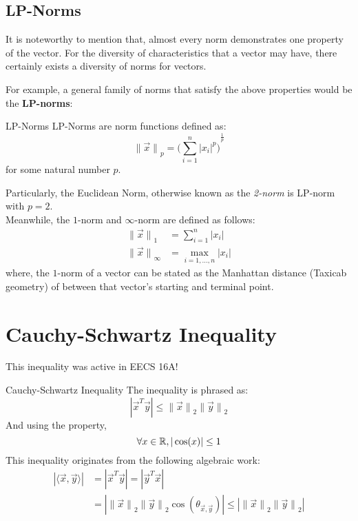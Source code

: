\subsection{LP-Norms}
It is noteworthy to mention that, almost every norm demonstrates one property of the vector.
For the diversity of characteristics that a vector may have, there certainly exists a diversity of norms for vectors.
\par
For example, a general family of norms that satisfy the above properties would be the \textbf{LP-norms}:
\begin{ln-define}{LP-Norms}{}
    LP-Norms are norm functions defined as:
    \[
        {\lVert \vec{x} \rVert}_p = {\bigg( \sum_{i = 1}^n |x_i|^p \bigg)}^{\frac{1}{p}}
    \]
    for some natural number $p$. \\
\end{ln-define}
Particularly, the Euclidean Norm, otherwise known as the \textit{2-norm} is LP-norm with $p = 2$. \\
Meanwhile, the $1$-norm and $\infty$-norm are defined as follows:
\begin{align*}
    {\lVert \vec{x} \rVert}_1 &= \sum_{i = 1}^n |x_i| \\
    {\lVert \vec{x} \rVert}_\infty &= \max_{i = 1, \dots, n} |x_i|
\end{align*}
where, the $1$-norm of a vector can be stated as the Manhattan distance (Taxicab geometry) of between that vector's starting and terminal point.

\section{Cauchy-Schwartz Inequality}
This inequality was active in EECS 16A!
\begin{ln-define}{Cauchy-Schwartz Inequality}{}
    The inequality is phrased as:
    \[
        |\vec{x}^T \vec{y}| \leq {\lVert \vec{x} \rVert}_2 {\lVert \vec{y} \rVert}_2
    \]
    And using the property,
    \[\forall x \in \mathbb{R}, |\cos(x)| \leq 1\]
    \tcblower
    This inequality originates from the following algebraic work:
    \begin{align*}
        |\langle \vec{x}, \vec{y} \rangle| &= |\vec{x}^T \vec{y}| = |\vec{y}^T \vec{x}| \\
        &= |{\lVert \vec{x} \rVert}_2 {\lVert \vec{y} \rVert}_2 \cos(\theta_{\vec{x}, \vec{y}})|
        \leq |{\lVert \vec{x} \rVert}_2 {\lVert \vec{y} \rVert}_2|
    \end{align*}
\end{ln-define}

